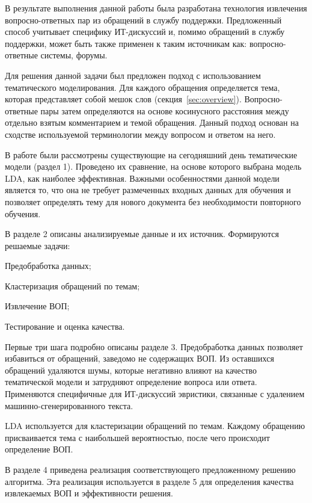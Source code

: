 \conclusion
В результате выполнения данной работы была разработана технология извлечения вопросно-ответных пар из обращений в службу поддержки. Предложенный способ учитывает специфику ИТ-дискуссий и, помимо обращений в службу поддержки, может быть также применен к таким источникам как: вопросно-ответные системы, форумы.

Для решения данной задачи был предложен подход с использованием тематического моделирования. Для каждого обращения определяется тема, которая представляет собой мешок слов (секция~\ref{sec:overview}). Вопросно-ответные пары затем определяются на основе косинусного расстояния между отдельно взятым комментарием и темой обращения. Данный подход основан на сходстве используемой терминологии между вопросом и ответом на него.

В работе были рассмотрены существующие на сегодняшний день тематические модели (раздел 1). Проведено их сравнение, на основе которого выбрана модель LDA, как наиболее эффективная. Важными особенностями данной модели является то, что она не требует размеченных входных данных для обучения и позволяет определять тему для нового документа без необходимости повторного обучения.

В разделе 2 описаны анализируемые данные и их источник. Формируются решаемые задачи: 

\begin{enumerate*}
\item Предобработка данных;
\item Кластеризация обращений по темам;
\item Извлечение ВОП;
\item Тестирование и оценка качества.
\end{enumerate*}

Первые три шага подробно описаны разделе 3. Предобработка данных позволяет избавиться от обращений, заведомо не содержащих ВОП. Из оставшихся обращений удаляются шумы, которые негативно влияют на качество тематической модели и затрудняют определение вопроса или ответа. Применяются специфичные для ИТ-дискуссий эвристики, связанные с удалением машинно-сгенерированного текста. 

LDA используется для кластеризации обращений по темам. Каждому обращению присваивается тема с наибольшей вероятностью, после чего происходит определение ВОП.

В разделе 4 приведена реализация соответствующего предложенному решению алгоритма. Эта реализация используется в разделе 5 для определения качества извлекаемых ВОП и эффективности решения.

